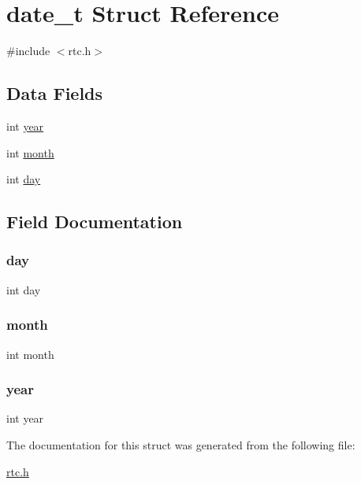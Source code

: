 \hypertarget{structdate__t}{}\section{date\+\_\+t Struct Reference}
\label{structdate__t}


{\ttfamily \#include $<$rtc.\+h$>$}

\subsection*{Data Fields}
\begin{DoxyCompactItemize}
\item 
int \hyperlink{structdate__t_abeac221e38b7b9ce7df8722c842bf671}{year}
\item 
int \hyperlink{structdate__t_aedb06abe5aff12fa3e7e0e71a374edfb}{month}
\item 
int \hyperlink{structdate__t_a4c11afc03fc3ee49bab660def6558f2a}{day}
\end{DoxyCompactItemize}


\subsection{Field Documentation}
\hypertarget{structdate__t_a4c11afc03fc3ee49bab660def6558f2a}{}\label{structdate__t_a4c11afc03fc3ee49bab660def6558f2a} 
\subsubsection{\texorpdfstring{day}{day}}
{\footnotesize\ttfamily int day}

\hypertarget{structdate__t_aedb06abe5aff12fa3e7e0e71a374edfb}{}\label{structdate__t_aedb06abe5aff12fa3e7e0e71a374edfb} 
\subsubsection{\texorpdfstring{month}{month}}
{\footnotesize\ttfamily int month}

\hypertarget{structdate__t_abeac221e38b7b9ce7df8722c842bf671}{}\label{structdate__t_abeac221e38b7b9ce7df8722c842bf671} 
\subsubsection{\texorpdfstring{year}{year}}
{\footnotesize\ttfamily int year}



The documentation for this struct was generated from the following file\+:\begin{DoxyCompactItemize}
\item 
\hyperlink{rtc_8h}{rtc.\+h}\end{DoxyCompactItemize}
